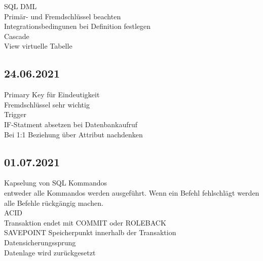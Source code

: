 \documentclass{article}
\begin{document}
	SQL DML\\
	Primär- und Fremdschlüssel beachten \\
	Integrationsbedingunen bei Definition festlegen \\
	Cascade \\
	View virtuelle Tabelle \\
	\subsection*{24.06.2021}
	Primary Key für Eindeutigkeit \\
	Fremdschlüssel sehr wichtig \\
	Trigger \\
	IF-Statment absetzen bei Datenbankaufruf \\
	Bei 1:1 Beziehung über Attribut nachdenken \\
	\subsection*{01.07.2021}
	Kapselung von SQL Kommandos \\
	entweder alle Kommandos werden ausgeführt. Wenn ein Befehl fehlschlägt werden alle Befehle rückgängig machen. \\
	ACID \\
	Transaktion endet mit COMMIT oder ROLEBACK \\
	SAVEPOINT Speicherpunkt innerhalb der Transaktion \\
	Datensicherungssprung \\
	Datenlage wird zurückgesetzt \\
	
\end{document}

